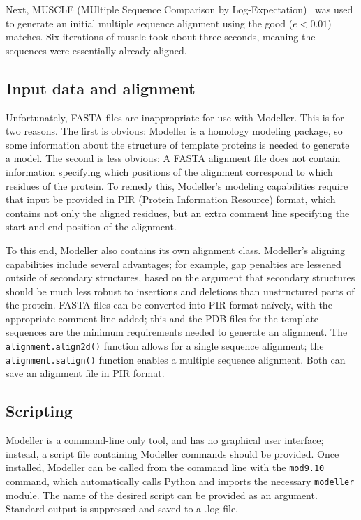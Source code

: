 \documentclass[]{report}   %
\begin{document}
Next, MUSCLE (MUltiple Sequence Comparison by Log-Expectation)~\cite{edgar2004muscle} was used to generate an initial multiple sequence alignment using the good ($e < 0.01$) matches. Six iterations of muscle took about three seconds, meaning the sequences were essentially already aligned.

\subsection*{Input data and alignment} 

Unfortunately, FASTA files are inappropriate for use with Modeller. This is for two reasons. The first is obvious: Modeller is a homology modeling package, so some information about the structure of template proteins is needed to generate a model. The second is less obvious: A FASTA alignment file does not contain information specifying which positions of the alignment correspond to which residues of the protein. To remedy this, Modeller's modeling capabilities require that input be provided in PIR (Protein Information Resource) format, which contains not only the aligned residues, but an extra comment line specifying the start and end position of the alignment.

To this end, Modeller also contains its own alignment class. Modeller's aligning capabilities include several advantages; for example, gap penalties are lessened outside of secondary structures, based on the argument that secondary structures should be much less robust to insertions and deletions than unstructured parts of the protein. FASTA files can be converted into PIR format na\"ively, with the appropriate comment line added; this and the PDB files for the template sequences are the minimum requirements needed to generate an alignment. The \texttt{alignment.align2d()} function allows for a single sequence alignment; the \texttt{alignment.salign()} function enables a multiple sequence alignment. Both can save an alignment file in PIR format.

\subsection*{Scripting}
Modeller is a command-line only tool, and has no graphical user interface; instead, a script file containing Modeller commands should be provided. Once installed, Modeller can be called from the command line with the \texttt{mod9.10} command, which automatically calls Python and imports the necessary \texttt{modeller} module. The name of the desired script can be provided as an argument. Standard output is suppressed and saved to a .log file.
\end{document}
